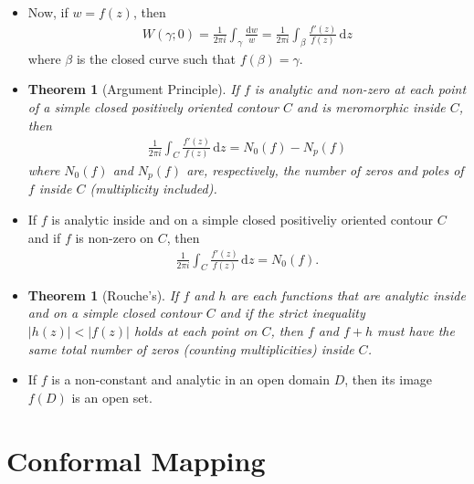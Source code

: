 \documentclass[10pt]{article}
\newtheorem{theorem}[lemma]{Theorem}
\newcommand{\dee}{\mathrm{d}}
\begin{document}
\begin{itemize}
    \item Now, if $w = f(z)$, then
    \begin{align*}
      W(\gamma; 0) = \frac{1}{2\pi i} \int_\gamma \frac{\dee w}{w} = \frac{1}{2\pi i}\int_\beta \frac{f'(z)}{f(z)}\, \dee z
    \end{align*}
    where $\beta$ is the closed curve such that $f(\beta) = \gamma$.

    \item \begin{theorem}[Argument Principle]
      If $f$ is analytic and non-zero at each point of a simple closed positively oriented contour $C$ and is meromorphic inside $C$, then
      \begin{align*}
        \frac{1}{2\pi i} \int_C \frac{f'(z)}{f(z)}\, \dee z = N_0(f) - N_p(f)
      \end{align*}
      where $N_0(f)$ and $N_p(f)$ are, respectively, the number of zeros and poles of $f$ inside $C$ (multiplicity included).
    \end{theorem}

    \item If $f$ is analytic inside and on a simple closed positiveliy oriented contour $C$ and if $f$ is non-zero on $C$, then
    \begin{align*}
      \frac{1}{2\pi i} \int_C \frac{f'(z)}{f(z)}\, \dee z = N_0(f).
    \end{align*}

    \item \begin{theorem}[Rouche's]
      If $f$ and $h$ are each functions that are analytic inside and on a simple closed contour $C$ and if the strict inequality $|h(z)| < |f(z)|$ holds at each point on $C$, then $f$ and $f+h$ must have the same total number of zeros (counting multiplicities) inside $C$.
    \end{theorem}

    \item If $f$ is a non-constant and analytic in an open domain $D$, then its image $f(D)$ is an open set.

  \end{itemize}  


  \section{Conformal Mapping} %
  \label{sec:conformal_mapping}
\end{document}
